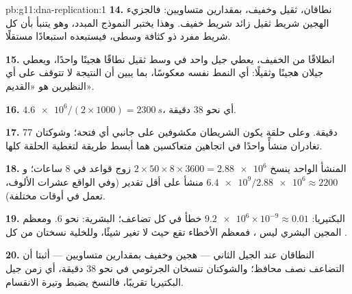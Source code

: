 \begin{solution}{pb:g11:dna-replication:1}
\textbf{14.} نطاقان، ثقيل وخفيف، بمقدارين متساويين: فالجزيء الهجين
شريط ثقيل زائد شريط خفيف. وهذا يختبر النموذج المبدد، وهو يتنبأ بأن كل
شريط مفرد ذو كثافة وسطى، فيستبعده استبعادًا مستقلًا.

\textbf{15.} انطلاقًا من الخفيف، يعطي جيل واحد في وسط ثقيل نطاقًا
هجينًا واحدًا، ويعطي جيلان هجينًا وثقيلًا: أي النمط نفسه معكوسًا، بما
يبين أن النتيجة لا تتوقف على أي النظيرين هو «القديم».

\textbf{16.} $\num{4.6e6}/(2 \times 1000) = \qty{2300}{s}$، أي نحو
38 دقيقة.

\textbf{17.} 77 دقيقة. وعلى حلقة يكون الشريطان مكشوفين على جانبي أي
فتحة؛ وشوكتان تغادران منشأً واحدًا في اتجاهين متعاكسين هما أبسط طريقة
لتغطية الحلقة كلها.

\textbf{18.} المنشأ الواحد ينسخ $2 \times 50 \times 8 \times 3600 =
\num{2.88e6}$ زوج قواعد في 8 ساعات؛ و$\num{6.4e9}/\num{2.88e6}
\approx 2200$ منشأ على أقل تقدير (وفي الواقع عشرات الألوف، تعمل في
أوقات مختلفة).

\textbf{19.} البكتيريا: $\num{9.2e6} \times 10^{-9} \approx 0.01$ خطأ
في كل تضاعف؛  البشرية: نحو 6. ومعظم المجين البشري ليس ،
فمعظم الأخطاء تقع حيث لا تغير شيئًا، وللخلية نسختان من كل .

\textbf{20.} النطاقان عند الجيل الثاني --- هجين وخفيف بمقدارين
متساويين --- أثبتا أن التضاعف نصف محافظ؛ والشوكتان تنسخان 
الجرثومي في نحو 38 دقيقة، أي زمن جيل البكتيريا تقريبًا، فالنسخ يضبط
وتيرة الانقسام.
\end{solution}
